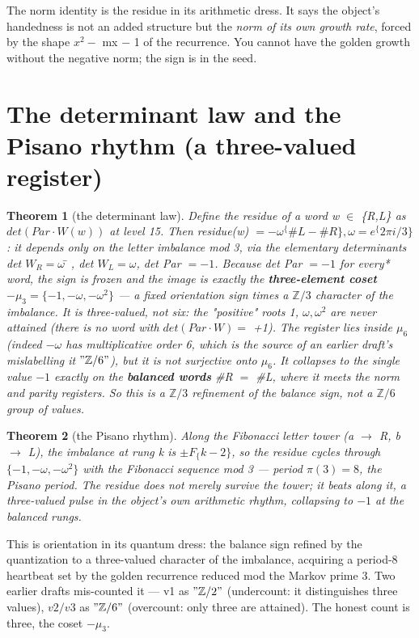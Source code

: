 \documentclass[11pt]{article}
\theoremstyle{plain}
\newtheorem{theorem}{Theorem}[section]
\theoremstyle{definition}
\theoremstyle{remark}
\begin{document}
The norm identity is the residue in its arithmetic dress. It says the object's handedness is not an added structure but the \emph{norm of its own growth rate}, forced by the shape \(x^{2} -\) mx \(-\) 1 of the recurrence. You cannot have the golden growth without the negative norm; the sign is in the seed.

\section{The determinant law and the Pisano rhythm (a three-valued register)}

\begin{theorem}[the determinant law]
Define the residue of a word w \(\in \) \{R,L\}\emph{ as \(det(Par\cdot W(w))\) at level 15. Then residue(w) \(= -\omega ^\{\#L-\#R\}, \omega  = e^\{2\pi i/3\}\): it depends only on the letter imbalance mod 3, via the elementary determinants det \(W_{R} = \omega ̄\), det \(W_{L} = \omega \), det Par \(= -1\). Because det Par \(= -1\) for }every* word, the sign is frozen and the image is exactly the \textbf{three-element coset \(-\mu _{3} = \{-1, -\omega , -\omega ^{2}\}\)} — a fixed orientation sign times a \(\mathbb{Z}/3\) character of the imbalance. It is \emph{three-valued}, not six: the "positive" roots 1, \(\omega , \omega ^{2}\) are never attained (there is no word with \(det(Par\cdot W) =\) +1). The register lies inside \(\mu _{6}\) (indeed \(-\omega \) has multiplicative order 6, which is the source of an earlier draft's mislabelling it \("\mathbb{Z}/6"\)), but it is not surjective onto \(\mu _{6}\). It collapses to the single value \(-1\) exactly on the \textbf{balanced words} \#R \(=\) \#L, where it meets the norm and parity registers. So this is a \(\mathbb{Z}/3\) \emph{refinement} of the balance sign, not a \(\mathbb{Z}/6\) group of values.
\end{theorem}

\begin{theorem}[the Pisano rhythm]
Along the Fibonacci letter tower (a \(\to \) R, b \(\to \) L), the imbalance at rung k is \(\pm F_\{k-2\}\), so the residue cycles through \(\{-1, -\omega , -\omega ^{2}\}\) with the Fibonacci sequence mod 3 — period \(\pi (3) = 8\), the Pisano period. The residue does not merely survive the tower; it \emph{beats} along it, a three-valued pulse in the object's own arithmetic rhythm, collapsing to \(-1\) at the balanced rungs.
\end{theorem}

This is orientation in its quantum dress: the balance sign refined by the quantization to a three-valued character of the imbalance, acquiring a period-8 heartbeat set by the golden recurrence reduced mod the Markov prime 3. Two earlier drafts mis-counted it — v1 as \("\mathbb{Z}/2"\) (undercount: it distinguishes three values), \(v2/v3\) as \("\mathbb{Z}/6"\) (overcount: only three are attained). The honest count is three, the coset \(-\mu _{3}\).
\end{document}
